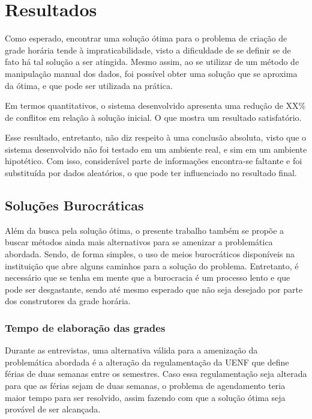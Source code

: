 \chapter{Resultados}


Como esperado, encontrar uma solução ótima para o problema de criação de grade horária tende à impraticabilidade, visto a dificuldade de se definir se de fato há tal solução a ser atingida. Mesmo assim, ao se utilizar de um método de manipulação manual dos dados, foi possível obter uma solução que se aproxima da ótima, e que pode ser utilizada na prática.

Em termos quantitativos, o sistema desenvolvido apresenta uma redução de XX\% de conflitos em relação à solução inicial. O que mostra um resultado satisfatório.

Esse resultado, entretanto, não diz respeito à uma conclusão absoluta, visto que o sistema desenvolvido não foi testado em um ambiente real, e sim em um ambiente hipotético. Com isso, considerável parte de informações encontra-se faltante e foi substituída por dados aleatórios, o que pode ter influenciado no resultado final.

\section{Soluções Burocráticas}


Além da busca pela solução ótima, o presente trabalho também se propõe a buscar métodos ainda mais alternativos para se amenizar a problemática abordada. Sendo, de forma simples, o uso de meios burocráticos disponíveis na instituição que abre alguns caminhos para a solução do problema. Entretanto, é necessário que se tenha em mente que a burocracia é um processo lento e que pode ser desgastante, sendo até mesmo esperado que não seja desejado por parte dos construtores da grade horária.

\subsection{Tempo de elaboração das grades}


Durante as entrevistas, uma alternativa válida para a amenização da problemática abordada é a alteração da regulamentação da UENF que define férias de duas semanas entre os semestres. Caso essa regulamentação seja alterada para que as férias sejam de duas semanas, o problema de agendamento teria maior tempo para ser resolvido, assim fazendo com que a solução ótima seja provável de ser alcançada.

